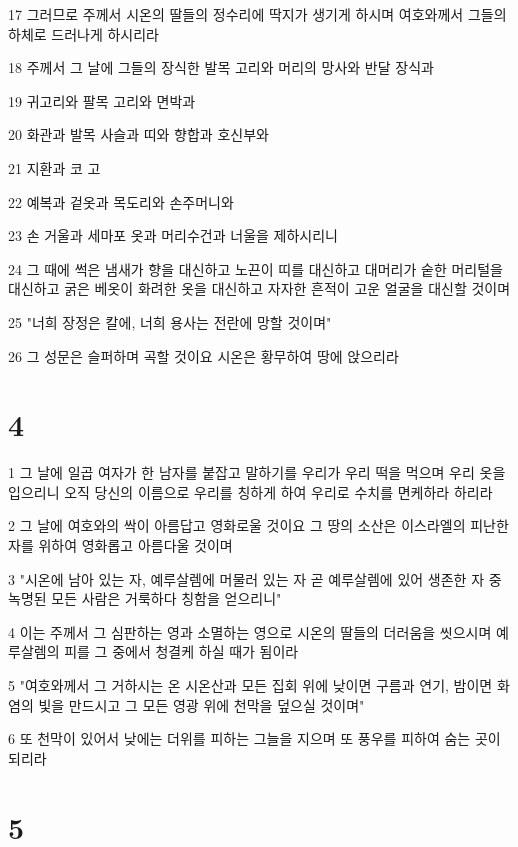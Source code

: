 \par 17 그러므로 주께서 시온의 딸들의 정수리에 딱지가 생기게 하시며 여호와께서 그들의 하체로 드러나게 하시리라
\par 18 주께서 그 날에 그들의 장식한 발목 고리와 머리의 망사와 반달 장식과
\par 19 귀고리와 팔목 고리와 면박과
\par 20 화관과 발목 사슬과 띠와 향합과 호신부와
\par 21 지환과 코 고리̙
\par 22 예복과 겉옷과 목도리와 손주머니와
\par 23 손 거울과 세마포 옷과 머리수건과 너울을 제하시리니
\par 24 그 때에 썩은 냄새가 향을 대신하고 노끈이 띠를 대신하고 대머리가 숱한 머리털을 대신하고 굵은 베옷이 화려한 옷을 대신하고 자자한 흔적이 고운 얼굴을 대신할 것이며
\par 25 "너희 장정은 칼에, 너희 용사는 전란에 망할 것이며"
\par 26 그 성문은 슬퍼하며 곡할 것이요 시온은 황무하여 땅에 앉으리라

\chapter{4}

\par 1 그 날에 일곱 여자가 한 남자를 붙잡고 말하기를 우리가 우리 떡을 먹으며 우리 옷을 입으리니 오직 당신의 이름으로 우리를 칭하게 하여 우리로 수치를 면케하라 하리라
\par 2 그 날에 여호와의 싹이 아름답고 영화로울 것이요 그 땅의 소산은 이스라엘의 피난한 자를 위하여 영화롭고 아름다울 것이며
\par 3 "시온에 남아 있는 자, 예루살렘에 머물러 있는 자 곧 예루살렘에 있어 생존한 자 중 녹명된 모든 사람은 거룩하다 칭함을 얻으리니"
\par 4 이는 주께서 그 심판하는 영과 소멸하는 영으로 시온의 딸들의 더러움을 씻으시며 예루살렘의 피를 그 중에서 청결케 하실 때가 됨이라
\par 5 "여호와께서 그 거하시는 온 시온산과 모든 집회 위에 낮이면 구름과 연기, 밤이면 화염의 빛을 만드시고 그 모든 영광 위에 천막을 덮으실 것이며"
\par 6 또 천막이 있어서 낮에는 더위를 피하는 그늘을 지으며 또 풍우를 피하여 숨는 곳이 되리라

\chapter{5}

